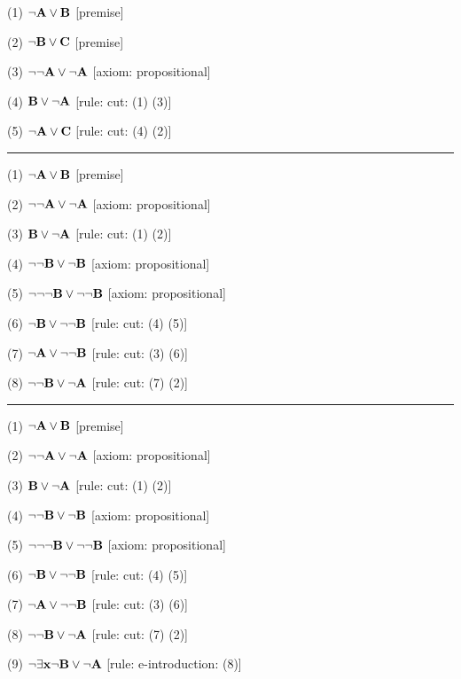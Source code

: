 \item{(1)} $\neg {\bf A} \lor {\bf B}$ \hfill [premise]
\item{(2)} $\neg {\bf B} \lor {\bf C}$ \hfill [premise]
\item{(3)} $\neg \neg {\bf A} \lor \neg {\bf A}$ \hfill [axiom: propositional]
\item{(4)} ${\bf B} \lor \neg {\bf A}$ \hfill [rule: cut: (1) (3)]
\item{(5)} $\neg {\bf A} \lor {\bf C}$ \hfill [rule: cut: (4) (2)]
\medskip
\hrule
\medskip
\item{(1)} $\neg {\bf A} \lor {\bf B}$ \hfill [premise]
\item{(2)} $\neg \neg {\bf A} \lor \neg {\bf A}$ \hfill [axiom: propositional]
\item{(3)} ${\bf B} \lor \neg {\bf A}$ \hfill [rule: cut: (1) (2)]
\item{(4)} $\neg \neg {\bf B} \lor \neg {\bf B}$ \hfill [axiom: propositional]
\item{(5)} $\neg \neg \neg {\bf B} \lor \neg \neg {\bf B}$ \hfill [axiom: propositional]
\item{(6)} $\neg {\bf B} \lor \neg \neg {\bf B}$ \hfill [rule: cut: (4) (5)]
\item{(7)} $\neg {\bf A} \lor \neg \neg {\bf B}$ \hfill [rule: cut: (3) (6)]
\item{(8)} $\neg \neg {\bf B} \lor \neg {\bf A}$ \hfill [rule: cut: (7) (2)]
\medskip
\hrule
\medskip
\item{(1)} $\neg {\bf A} \lor {\bf B}$ \hfill [premise]
\item{(2)} $\neg \neg {\bf A} \lor \neg {\bf A}$ \hfill [axiom: propositional]
\item{(3)} ${\bf B} \lor \neg {\bf A}$ \hfill [rule: cut: (1) (2)]
\item{(4)} $\neg \neg {\bf B} \lor \neg {\bf B}$ \hfill [axiom: propositional]
\item{(5)} $\neg \neg \neg {\bf B} \lor \neg \neg {\bf B}$ \hfill [axiom: propositional]
\item{(6)} $\neg {\bf B} \lor \neg \neg {\bf B}$ \hfill [rule: cut: (4) (5)]
\item{(7)} $\neg {\bf A} \lor \neg \neg {\bf B}$ \hfill [rule: cut: (3) (6)]
\item{(8)} $\neg \neg {\bf B} \lor \neg {\bf A}$ \hfill [rule: cut: (7) (2)]
\item{(9)} $\neg \exists {\bf x} \neg {\bf B} \lor \neg {\bf A}$ \hfill [rule: e-introduction: (8)]
